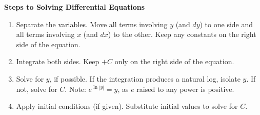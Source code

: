\textbf{Steps to Solving Differential Equations} \par

\begin{enumerate}
    \item Separate the variables. Move all terms involving $y$ (and $dy$) to one side and all terms involving $x$ (and $dx$) to the other. Keep any constants on the right side of the equation.
    \item Integrate both sides. Keep $+C$ only on the right side of the equation.
    \item Solve for $y$, if possible. If the integration produces a natural log, isolate $y$. If not, solve for $C$. Note: $e^{\ln |y|} = y$, as $e$ raised to any power is positive.
    \item Apply initial conditions (if given). Substitute initial values to solve for $C$.
\end{enumerate} \vspace{11pt}

